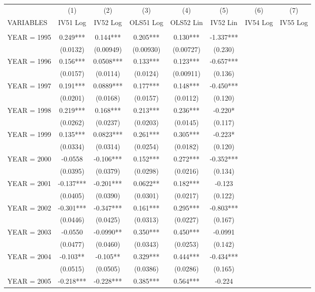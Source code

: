 \begin{tabular}{lccccccc} \hline
 & (1) & (2) & (3) & (4) & (5) & (6) & (7) \\
VARIABLES & IV51 Log & IV52 Log & OLS51 Log & OLS52 Lin & IV52 Lin & IV54 Log & IV55 Log \\ \hline
 &  &  &  &  &  &  &  \\
YEAR = 1995 & 0.249*** & 0.144*** & 0.205*** & 0.130*** & -1.337*** &  &  \\
 & (0.0132) & (0.00949) & (0.00930) & (0.00727) & (0.230) &  &  \\
YEAR = 1996 & 0.156*** & 0.0508*** & 0.133*** & 0.123*** & -0.657*** &  &  \\
 & (0.0157) & (0.0114) & (0.0124) & (0.00911) & (0.136) &  &  \\
YEAR = 1997 & 0.191*** & 0.0889*** & 0.177*** & 0.148*** & -0.450*** &  &  \\
 & (0.0201) & (0.0168) & (0.0157) & (0.0112) & (0.120) &  &  \\
YEAR = 1998 & 0.219*** & 0.168*** & 0.213*** & 0.236*** & -0.220* &  &  \\
 & (0.0262) & (0.0237) & (0.0203) & (0.0145) & (0.117) &  &  \\
YEAR = 1999 & 0.135*** & 0.0823*** & 0.261*** & 0.305*** & -0.223* &  &  \\
 & (0.0334) & (0.0314) & (0.0254) & (0.0182) & (0.120) &  &  \\
YEAR = 2000 & -0.0558 & -0.106*** & 0.152*** & 0.272*** & -0.352*** &  &  \\
 & (0.0395) & (0.0379) & (0.0298) & (0.0216) & (0.134) &  &  \\
YEAR = 2001 & -0.137*** & -0.201*** & 0.0622** & 0.182*** & -0.123 &  &  \\
 & (0.0405) & (0.0390) & (0.0301) & (0.0217) & (0.122) &  &  \\
YEAR = 2002 & -0.301*** & -0.347*** & 0.161*** & 0.295*** & -0.803*** &  &  \\
 & (0.0446) & (0.0425) & (0.0313) & (0.0227) & (0.167) &  &  \\
YEAR = 2003 & -0.0550 & -0.0990** & 0.350*** & 0.450*** & -0.0991 &  &  \\
 & (0.0477) & (0.0460) & (0.0343) & (0.0253) & (0.142) &  &  \\
YEAR = 2004 & -0.103** & -0.105** & 0.329*** & 0.444*** & -0.434*** &  &  \\
 & (0.0515) & (0.0505) & (0.0386) & (0.0286) & (0.165) &  &  \\
YEAR = 2005 & -0.218*** & -0.228*** & 0.385*** & 0.564*** & -0.224 &  &  \\

\end{tabular}
